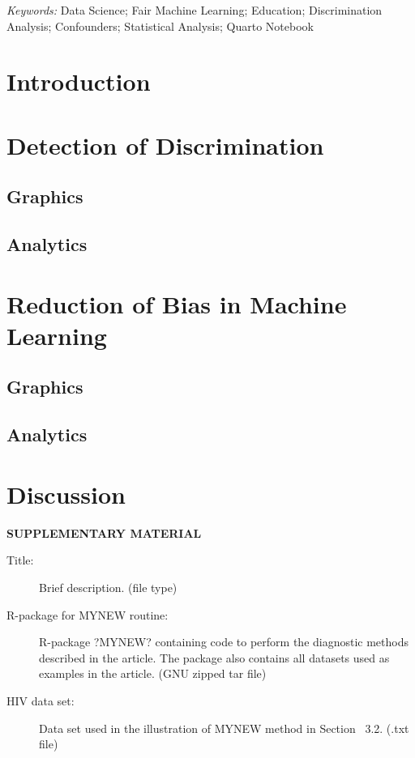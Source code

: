 \documentclass[12pt]{article}
\begin{document}
\noindent%
{\it Keywords:} Data Science; Fair Machine Learning; Education; Discrimination Analysis; Confounders; Statistical Analysis; Quarto Notebook
\vfill

\newpage
{} %
\section{Introduction}
\label{sec:intro}

\section{Detection of Discrimination}
\label{sec:detect}

\subsection{Graphics}
\subsection{Analytics}



\section{Reduction of Bias in Machine Learning}
\label{sec:ml}

\subsection{Graphics}
\subsection{Analytics}


\section{Discussion}
\label{sec:conc}


\bigskip
\begin{center}
{\large\bf SUPPLEMENTARY MATERIAL}
\end{center}

\begin{description}

\item[Title:] Brief description. (file type)

\item[R-package for  MYNEW routine:] R-package ?MYNEW? containing code to perform the diagnostic methods described in the article. The package also contains all datasets used as examples in the article. (GNU zipped tar file)

\item[HIV data set:] Data set used in the illustration of MYNEW method in Section~ 3.2. (.txt file)

\end{description}
\end{document}
